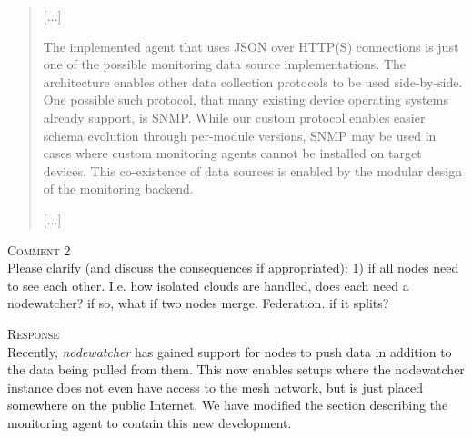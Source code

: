 \documentclass[12pt,twoside,a4paper]{report}
\newcommand{\nodewatcher}{\textit{nodewatcher}}
\begin{document}
\begin{quote}

[...]

The implemented agent that uses JSON over HTTP(S) connections is just one of the possible monitoring data source implementations.
The architecture enables other data collection protocols to be used side-by-side.
One possible such protocol, that many existing device operating systems already support, is SNMP.
While our custom protocol enables easier schema evolution through per-module versions, SNMP may be used in cases where custom monitoring agents cannot be installed on target devices.
This co-existence of data sources is enabled by the modular design of the monitoring backend.

[...]

\end{quote}

\vspace{0.5cm}\noindent\textsc{Comment 2}\\
Please clarify (and discuss the consequences if appropriated): 1) if all nodes need to see each other. I.e. how isolated clouds are handled, does each need a nodewatcher? if so, what if two nodes merge. Federation. if it splits?

\vspace{0.5cm}\noindent\textsc{Response}\\
Recently, \nodewatcher{} has gained support for nodes to push data in addition to the data being pulled from them. 
This now enables setups where the nodewatcher instance does not even have access to the mesh network, but is just placed somewhere on the public Internet.
We have modified the section describing the monitoring agent to contain this new development.
\end{document}
